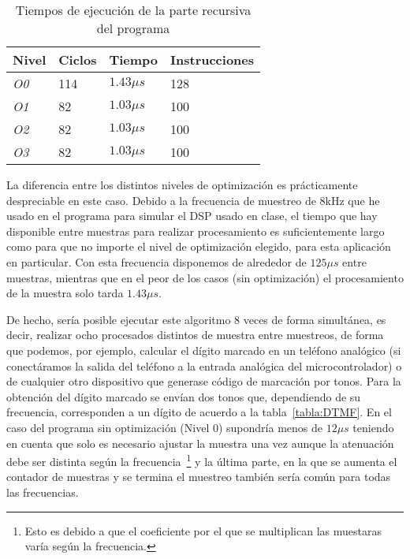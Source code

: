 \begin{table}[htb]
	\begin{center}
		\begin{tabular}{llll}
			\textbf{Nivel} & \textbf{Ciclos} & \textbf{Tiempo} & \textbf{Instrucciones} \\
			\toprule
			\textit{O0} & 114 & \(1.43\mu s\) & 128 \\
			\textit{O1} & 82 & \(1.03\mu s\) & 100 \\
			\textit{O2} & 82 & \(1.03\mu s\) & 100 \\
			\textit{O3} & 82 & \(1.03\mu s\) & 100 \\
		\end{tabular}
		\caption{Tiempos de ejecución de la parte recursiva del programa}
		\label{tabla:tiempos_goertzel}
	\end{center}
\end{table}

La diferencia entre los distintos niveles de optimización es prácticamente despreciable en este caso. Debido a la frecuencia de muestreo de 8kHz que he usado en el programa para simular el DSP usado en clase, el tiempo que hay disponible entre muestras para realizar procesamiento es suficientemente largo como para que no importe el nivel de optimización elegido, para esta aplicación en particular. Con esta frecuencia disponemos de alrededor de \(125\mu s\) entre muestras, mientras que en el peor de los casos (sin optimización) el procesamiento de la muestra solo tarda \(1.43\mu s\).

De hecho, sería posible ejecutar este algoritmo 8 veces de forma simultánea, es decir, realizar ocho procesados distintos de muestra entre muestreos, de forma que podemos, por ejemplo, calcular el dígito marcado en un teléfono analógico (si conectáramos la salida del teléfono a la entrada analógica del microcontrolador) o de cualquier otro dispositivo que generase código de marcación por tonos. Para la obtención del dígito marcado se envían dos tonos que, dependiendo de su frecuencia, corresponden a un dígito de acuerdo a la tabla~\ref{tabla:DTMF}. En el caso del programa sin optimización (Nivel 0) supondría menos de \(12\mu s\) teniendo en cuenta que solo es necesario ajustar la muestra una vez aunque la atenuación debe ser distinta según la frecuencia~\footnote{Esto es debido a que el coeficiente por el que se multiplican las muestaras varía según la frecuencia.} y la última parte, en la que se aumenta el contador de muestras y se termina el muestreo también sería común para todas las frecuencias. 

